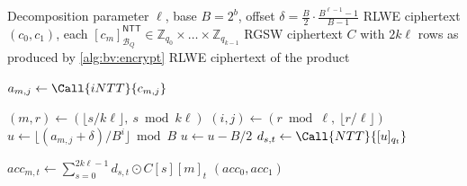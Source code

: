 \begin{algorithm}
\caption{Parallel External Product $\rlwe \boxdot \rgsw$ (RNS)}
\label{alg:bv:extprod}
\begin{algorithmic}[1]
\Require Decomposition parameter $\ell$, base $B = 2^b$, offset $\delta = \frac{B}{2}\cdot\frac{B^{\ell-1}-1}{B-1}$
\Require RLWE ciphertext $(c_0, c_1)$, each $[c_m]^{\mathsf{NTT}}_{\mathcal{B}_Q} \in \mathbb{Z}_{q_0} \times \dots \times  \mathbb{Z}_{q_{k-1}}$
\Require RGSW ciphertext $C$ with $2k\ell$ rows as produced by \autoref{alg:bv:encrypt}
\Ensure RLWE ciphertext of the product

\For{$(m, j) \gets [0, 2) \times [0, k)$ \textbf{in parallel}}
    \State $a_{m,j} \gets \Call{iNTT}{c_{m,j}}$
\EndFor

\For{$(s, t) \gets [0, 2k\ell) \times [0, k)$ \textbf{in parallel}}
    \State $(m, r) \gets (\lfloor s/k\ell \rfloor,\ s \bmod k\ell)$
    \State $(i, j) \gets (r \bmod \ell,\ \lfloor r/\ell \rfloor)$
    \State $u \gets \lfloor (a_{m,j} + \delta) / B^i \rfloor \bmod B$
        \State $u \gets u - B/2$
    \EndIf
    \State $d_{s,t} \gets \Call{NTT}{[u]_{q_t}}$
\EndFor

\For{$(m, t) \gets [0, 2) \times [0, k)$ \textbf{in parallel}}
    \State $acc_{m,t} \gets \sum_{s=0}^{2k\ell - 1} d_{s,t} \odot C[s][m]_t$
\EndFor
\State \Return $(acc_0, acc_1)$
\end{algorithmic}
\end{algorithm}
